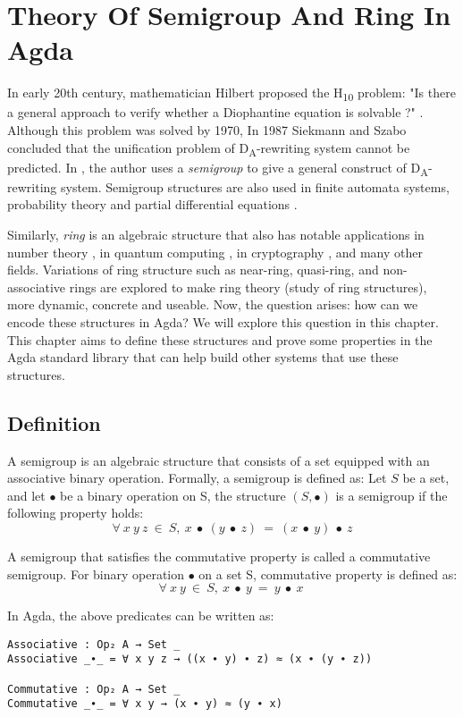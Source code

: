 \chapter{Theory Of Semigroup And Ring In Agda}
In early 20th century, mathematician Hilbert proposed the H\textsubscript{10}
problem: "Is there a general approach to verify whether a Diophantine equation
is solvable ?" \cite{larchey2020hilbert}. Although this problem was solved by
1970, In 1987 Siekmann and Szabo concluded that the unification problem of
D\textsubscript{A}-rewriting system\cite{DARewriting} cannot be predicted. In
\cite{deng2016characterizations}, the author uses a \textit{semigroup} to give a
general construct of D\textsubscript{A}-rewriting system. Semigroup structures
are also used in finite automata systems, probability theory and partial
differential equations \cite{liaqat2021some}.

Similarly, \textit{ring} is an algebraic structure that also has notable
applications in number theory \cite{pedrouzo2021revisiting}, in quantum computing
\cite{netto2008influence}, in cryptography \cite{khathuria2021algebraic}, and many other
fields. Variations of ring structure such as near-ring, quasi-ring, and
non-associative rings are explored to make ring theory (study of ring
structures), more dynamic, concrete and useable. Now, the question arises: how
can we encode these structures in Agda? We will explore this question in this
chapter. This chapter aims to define these structures and prove some properties
in the Agda standard library that can help build other systems that use these
structures. 

\section{Definition}
A semigroup is an algebraic structure that consists of a set equipped with an
associative binary operation. Formally, a semigroup is defined as: Let $S$ be a
set, and let $∙$ be a binary operation on S, the structure $(S,∙)$ is a
semigroup if the following property holds:
\[\forall\ x\ y\ z\ \in\ S ,\ x\ ∙\ (y\ ∙\ z)\ =\ (x\ ∙\ y)\ ∙\ z\]

A semigroup that satisfies the commutative property is called a commutative
semigroup. For binary operation \( ∙ \) on a set S, commutative property is
defined as:
\[ \forall\ x\ y\ \in\ S ,\ x\ ∙\ y\ =\ y\ ∙\ x\ \]

In Agda, the above predicates can be written as:

\begin{verbatim}
Associative : Op₂ A → Set _
Associative _∙_ = ∀ x y z → ((x ∙ y) ∙ z) ≈ (x ∙ (y ∙ z))

Commutative : Op₂ A → Set _
Commutative _∙_ = ∀ x y → (x ∙ y) ≈ (y ∙ x)
\end{verbatim}

